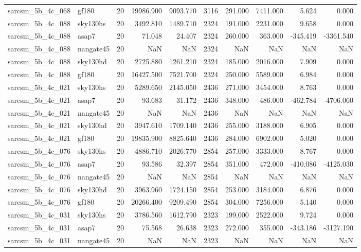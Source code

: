 \begin{longtable}{llrrrrrrrr}
sarcsm\_5b\_4c\_068 & gf180 & 20 & 19986.900 & 9093.770 & 3116 & 291.000 & 7411.000 & 5.624 & 0.000 \\
sarcsm\_5b\_4c\_088 & sky130hs & 20 & 3492.810 & 1489.710 & 2324 & 191.000 & 2231.000 & 9.658 & 0.000 \\
sarcsm\_5b\_4c\_088 & asap7 & 20 & 71.048 & 24.407 & 2324 & 260.000 & 363.000 & -345.419 & -3361.540 \\
sarcsm\_5b\_4c\_088 & nangate45 & 20 & NaN & NaN & 2324 & NaN & NaN & NaN & NaN \\
sarcsm\_5b\_4c\_088 & sky130hd & 20 & 2725.880 & 1261.210 & 2324 & 185.000 & 2016.000 & 7.909 & 0.000 \\
sarcsm\_5b\_4c\_088 & gf180 & 20 & 16427.500 & 7521.700 & 2324 & 250.000 & 5589.000 & 6.984 & 0.000 \\
sarcsm\_5b\_4c\_021 & sky130hs & 20 & 5289.650 & 2145.050 & 2436 & 271.000 & 3454.000 & 8.763 & 0.000 \\
sarcsm\_5b\_4c\_021 & asap7 & 20 & 93.683 & 31.172 & 2436 & 348.000 & 486.000 & -462.784 & -4706.060 \\
sarcsm\_5b\_4c\_021 & nangate45 & 20 & NaN & NaN & 2436 & NaN & NaN & NaN & NaN \\
sarcsm\_5b\_4c\_021 & sky130hd & 20 & 3947.610 & 1709.140 & 2436 & 255.000 & 3188.000 & 6.905 & 0.000 \\
sarcsm\_5b\_4c\_021 & gf180 & 20 & 19835.900 & 8825.640 & 2436 & 284.000 & 6902.000 & 5.020 & 0.000 \\
sarcsm\_5b\_4c\_076 & sky130hs & 20 & 4886.710 & 2026.770 & 2854 & 257.000 & 3333.000 & 8.767 & 0.000 \\
sarcsm\_5b\_4c\_076 & asap7 & 20 & 93.586 & 32.397 & 2854 & 351.000 & 472.000 & -410.086 & -4125.030 \\
sarcsm\_5b\_4c\_076 & nangate45 & 20 & NaN & NaN & 2854 & NaN & NaN & NaN & NaN \\
sarcsm\_5b\_4c\_076 & sky130hd & 20 & 3963.960 & 1724.150 & 2854 & 253.000 & 3184.000 & 6.876 & 0.000 \\
sarcsm\_5b\_4c\_076 & gf180 & 20 & 20266.400 & 9209.490 & 2854 & 304.000 & 7256.000 & 5.140 & 0.000 \\
sarcsm\_5b\_4c\_031 & sky130hs & 20 & 3786.560 & 1612.790 & 2323 & 199.000 & 2522.000 & 9.724 & 0.000 \\
sarcsm\_5b\_4c\_031 & asap7 & 20 & 75.568 & 26.638 & 2323 & 272.000 & 355.000 & -343.186 & -3127.190 \\
sarcsm\_5b\_4c\_031 & nangate45 & 20 & NaN & NaN & 2323 & NaN & NaN & NaN & NaN \\

\end{longtable}
